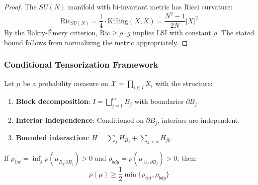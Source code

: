 \begin{proof}
The $SU(N)$ manifold with bi-invariant metric has Ricci curvature:
\begin{equation}
\mathrm{Ric}_{SU(N)} = \frac{1}{4} \cdot \mathrm{Killing}(X, X) = \frac{N^2-1}{2N} |X|^2
\end{equation}
By the Bakry-Émery criterion, $\mathrm{Ric} \geq \rho \cdot g$ implies LSI with constant $\rho$.
The stated bound follows from normalizing the metric appropriately.
\end{proof}

\subsubsection{Conditional Tensorization Framework}

\begin{theorem}
\label{thm:cond_tensor}
Let $\mu$ be a probability measure on $\mathcal{X} = \prod_{i \in I} X_i$ with the structure:
\begin{enumerate}
\item[(C1)] \textbf{Block decomposition}: $I = \bigsqcup_{j=1}^m B_j$ with boundaries $\partial B_j$.
\item[(C2)] \textbf{Interior independence}: Conditioned on $\partial B_j$, interiors are independent.
\item[(C3)] \textbf{Bounded interaction}: $H = \sum_j H_{B_j} + \sum_{j<k} H_{jk}$.
\end{enumerate}
If $\rho_{int} = \inf_j \rho(\mu_{B_j|\partial B_j}) > 0$ and $\rho_{bdy} = \rho(\mu_{\cup_j \partial B_j}) > 0$, then:
\begin{equation}
\rho(\mu) \geq \frac{1}{2} \min\{\rho_{int}, \rho_{bdy}\}
\end{equation}
\end{theorem}

